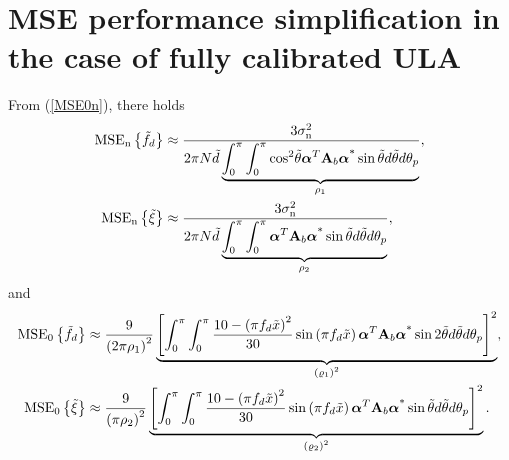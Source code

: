 \documentclass[12pt, draftclsnofoot, onecolumn]{IEEEtran}
\begin{document}
\vspace{-0.6em}
\section{MSE performance simplification in the case of fully calibrated ULA}{\label{MSE_ULA_proof}}
From (\ref{MSE0n}), there holds
\begin{align}\label{MSEn_pULA}
{{\text{MSE}}_{\mathrm{n}}}\left\{ {{{\tilde{f}}}_{d}} \right\} & \approx \frac{3\sigma _{\mathrm{n}}^{2}}{2{ \rm{\pi} }N\tilde{d} \underbrace{\int_{0}^{ \rm{\pi} }{\int_{0}^{ \rm{\pi} }{{{\cos }^{2}}\tilde{\theta }{{\boldsymbol{\alpha }}^{T}}{{\mathbf{A}}_{b}}{{\boldsymbol{\alpha }}^{\text{*}}} \sin \tilde{\theta} d\tilde{\theta }}d{{\theta }_{p}}}}_{{\rho_{1}}} }, \nonumber \\
{{\text{MSE}}_{\mathrm{n}}}\left\{ {{{\tilde{\xi}}}} \right\} & \approx \frac{3\sigma _{\mathrm{n}}^{2}}{2{ \rm{\pi} }N\tilde{d} \underbrace{\int_{0}^{ \rm{\pi} }{\int_{0}^{ \rm{\pi} }{{{\boldsymbol{\alpha }}^{T}}{{\mathbf{A}}_{b}}{{\boldsymbol{\alpha }}^{\text{*}}} \sin \tilde{\theta} d\tilde{\theta }}d{{\theta }_{p}}}}_{{\rho_{2}}} },
\end{align}
and
\begin{align}\label{MSE0_pULA}
{{\text{MSE}}_{0}}\left\{ {{{\tilde{f}}}_{d}} \right\} & \approx \frac{9} {\left( 2{\rm{\pi}}{\rho_{1}} \right)^2 }  \underbrace{\left[ \int_{0}^{ \rm{\pi} }\int_{0}^{ \rm{\pi} } \frac{10 - {{\left( { \rm{\pi} } {{f}_{d}}\tilde{x} \right)}^{2}}}{30} \sin \left( { \rm{\pi} }{{f}_{d}}\tilde{x} \right){{\boldsymbol{\alpha }}^{T}}{{\mathbf{A}}_{b}}{{\boldsymbol{\alpha }}^{\text{*}}}\sin 2\tilde{\theta }d\tilde{\theta }d{{\theta }_{p}} \right]^2}_{ \left( \varrho_{1} \right)^2}, \nonumber \\
{{\text{MSE}}_{0}}\left\{ {{{\tilde{\xi}}}} \right\} & \approx  \frac{9} { \left( {\rm{\pi}}{\rho_{2}} \right)^2 }  \underbrace{\left[ \int_{0}^{ \rm{\pi} }\int_{0}^{ \rm{\pi} } \frac{10 - {{\left( { \rm{\pi} } {{f}_{d}}\tilde{x} \right)}^{2}}}{30} \sin \left( { \rm{\pi} }{{f}_{d}}\tilde{x} \right){{\boldsymbol{\alpha }}^{T}}{{\mathbf{A}}_{b}}{{\boldsymbol{\alpha }}^{\text{*}}}\sin \tilde{\theta }d\tilde{\theta }d{{\theta }_{p}} \right]^2}_{ \left( \varrho_{2} \right)^2}.
\end{align}
\end{document}
